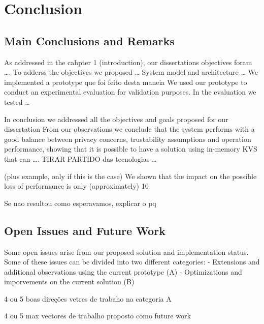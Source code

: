 \chapter{Conclusion}
\label{cha:conclusion}

\section{Main Conclusions and Remarks}

As addressed in the cahpter 1 (introduction), our dissertations objectives foram …. 
To adderss the objectives we proposed …   System model and architecture … 
We implemented a prototype que foi feito desta maneia 
We used our prototype to conduct an experimental evaluation for validation purposes. In the evaluation we tested …



In conclusion we addressed all the objectives and goals proposed for our dissertation
From our observations we conclude that the system performs with a good balance between privacy concerns, trustability assumptions and operation performance, showing that it is possible to have a solution using in-memory KVS that can …. TIRAR PARTIDO das tecnologias … 

(plus example, only if this is the case)
We shown that the impact on the possible loss of performance is only (approximately) 10%

Se nao resultou como esperavamos, explicar o pq


\section{Open Issues and Future Work}

Some open issues arise from our proposed solution and implementation status. Some of these issues can be divided into two different categories:
-	Extensions and additional observations using the current prototype (A)
-	Optimizations and imporvements on the current solution (B) 


4 ou 5 boas direções vetres de trabaho na categoria A

4 ou 5 max vectores de trabalho proposto como future work

